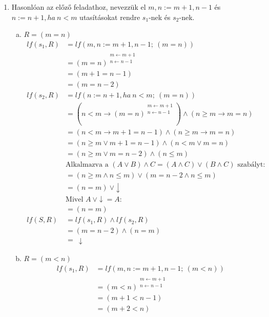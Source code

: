 \documentclass[12pt]{article}
\begin{document}
\begin{enumerate}
		\item Hasonlóan az előző feladathoz, nevezzük el $m,n := m+1, n-1$ és $n := n + 1, ha\ n < m$ utasításokat rendre $s_1$-nek és $s_2$-nek.
			\begin{enumerate}[a)]
				\item $R = (m = n)$
					\begin{align*}
						lf(s_1, R) &= lf(m,n := m+1, n-1;\ (m = n)) \\
							&= (m = n)^{\substack{ m \leftarrow m + 1 \\ n \leftarrow n - 1 }} \\
							&= (m+1 = n-1) \\
							&= (m = n-2) \\
						lf(s_2, R) &= lf(n := n + 1, ha\ n < m;\ (m = n)) \\
							&= (n < m \rightarrow (m = n)^{\substack{ m \leftarrow m + 1 \\ n \leftarrow n - 1 }}) \land (n \ge m \rightarrow m = n) \\
							&= (n < m \rightarrow m + 1 = n - 1) \land (n \ge m \rightarrow m = n) \\
							&= (n \ge m \lor m + 1 = n - 1) \land (n < m \lor m = n) \\
							&= (n \ge m \lor m = n - 2) \land (n \leq m) \\
							&\text{Alkalmazva a } (A \lor B) \land C = (A \land C) \lor (B \land C) \text{ szabályt:} \\
							&= (n \ge m \land n \leq m) \lor (m = n - 2 \land n \leq m) \\
							&= (n = m)\ \lor \downarrow \\
							&\text{Mivel } A\ \lor \downarrow = A: \\
							&= (n = m) \\
						lf(S, R) &= lf(s_1, R) \land lf(s_2, R) \\
						&= (m = n-2) \land (n = m) \\
						&=\ \downarrow
					\end{align*}
				\item $R = (m < n)$
					\begin{align*}
						lf(s_1, R) &= lf(m,n := m+1, n-1;\ (m < n)) \\
							&= (m < n)^{\substack{ m \leftarrow m + 1 \\ n \leftarrow n - 1 }} \\
							&= (m+1 < n-1) \\
							&= (m+2 < n) \\

\end{align*}
\end{enumerate}
\end{enumerate}
\end{document}
